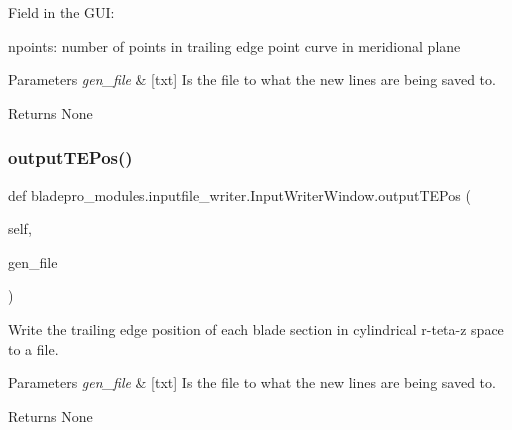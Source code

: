 Field in the G\+UI\+: \begin{DoxyItemize}
\item {\ttfamily npoints\+:} number of points in trailing edge point curve in meridional plane\end{DoxyItemize}

\begin{DoxyParams}{Parameters}
{\em gen\+\_\+file} & \mbox{[}txt\mbox{]} Is the file to what the new lines are being saved to. \\
\hline
\end{DoxyParams}
\begin{DoxyReturn}{Returns}
None 
\end{DoxyReturn}
\hypertarget{classbladepro__modules_1_1inputfile__writer_1_1_input_writer_window_af96b8ec5130403c737d4105e04edea5d}{}\label{classbladepro__modules_1_1inputfile__writer_1_1_input_writer_window_af96b8ec5130403c737d4105e04edea5d} 
\subsubsection{\texorpdfstring{output\+T\+E\+Pos()}{outputTEPos()}}
{\footnotesize\ttfamily def bladepro\+\_\+modules.\+inputfile\+\_\+writer.\+Input\+Writer\+Window.\+output\+T\+E\+Pos (\begin{DoxyParamCaption}\item[{}]{self,  }\item[{}]{gen\+\_\+file }\end{DoxyParamCaption})}



Write the trailing edge position of each blade section in cylindrical r-\/teta-\/z space to a file. 


\begin{DoxyParams}{Parameters}
{\em gen\+\_\+file} & \mbox{[}txt\mbox{]} Is the file to what the new lines are being saved to. \\
\hline
\end{DoxyParams}
\begin{DoxyReturn}{Returns}
None 
\end{DoxyReturn}
\hypertarget{classbladepro__modules_1_1inputfile__writer_1_1_input_writer_window_a0e71786a8b6fe43e6a01ff388c34ce18}{}\label{classbladepro__modules_1_1inputfile__writer_1_1_input_writer_window_a0e71786a8b6fe43e6a01ff388c34ce18} 
